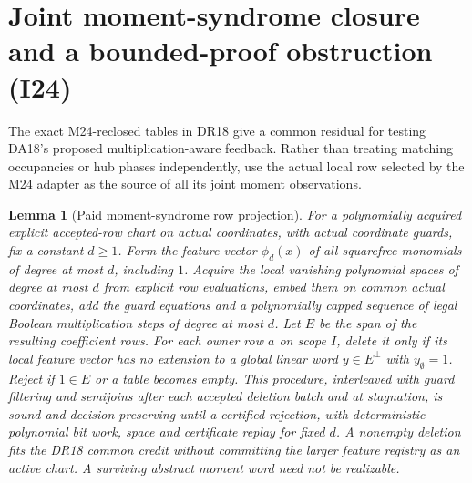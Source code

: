 \documentclass[11pt]{article}
\newtheorem{lemma}[theorem]{Lemma}
\begin{document}
\section{Joint moment-syndrome closure and a bounded-proof obstruction (I24)}\label{sec:i24}
The exact M24-reclosed tables in DR18 give a common residual for testing DA18's proposed multiplication-aware feedback. Rather than treating matching occupancies or hub phases independently, use the actual local row selected by the M24 adapter as the source of all its joint moment observations.
\begin{lemma}[Paid moment-syndrome row projection]\label{lem:i24-moment}
For a polynomially acquired explicit accepted-row chart on actual coordinates, with actual coordinate guards, fix a constant $d\ge1$. Form the feature vector $\phi_d(x)$ of all squarefree monomials of degree at most $d$, including $1$. Acquire the local vanishing polynomial spaces of degree at most $d$ from explicit row evaluations, embed them on common actual coordinates, add the guard equations and a polynomially capped sequence of legal Boolean multiplication steps of degree at most $d$. Let $E$ be the span of the resulting coefficient rows. For each owner row $a$ on scope $I$, delete it only if its local feature vector has no extension to a global linear word $y\in E^\perp$ with $y_\emptyset=1$. Reject if $1\in E$ or a table becomes empty. This procedure, interleaved with guard filtering and semijoins after each accepted deletion batch and at stagnation, is sound and decision-preserving until a certified rejection, with deterministic polynomial bit work, space and certificate replay for fixed $d$. A nonempty deletion fits the DR18 common credit without committing the larger feature registry as an active chart. A surviving abstract moment word need not be realizable.
\end{lemma}
\end{document}
